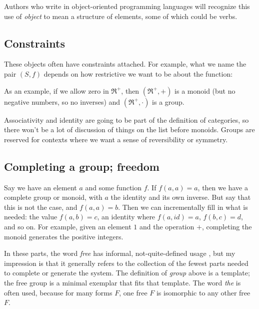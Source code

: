 \documentclass[11pt]{article}
\begin{document}
Authors who write in object-oriented programming languages will recognize this
use of {\em object} to mean a structure of elements, some of which could be verbs.

\subsection{Constraints}
These objects often have constraints attached. For example, what we name the pair $(S, f)$ depends on
how restrictive we want to be about the function:


As an example, if we allow zero in $\Re^+$, then $(\Re^+, +)$ is a monoid (but no
negative numbers, so no inverses) and $(\Re^+, \cdot)$ is a group.

Associativity and identity are going to be part of the definition of categories,
so there won't be a lot of discussion of things on the list before monoids.
Groups are reserved for contexts where we want a sense of reversibility or symmetry.

\subsection{Completing a group; freedom} Say we have an element $a$ and some function $f$. If
$f(a,a)=a$, then we have a complete group or monoid, with $a$ the identity and its own
inverse.  But say that this is not the case, and $f(a,a)=b$. Then we can incrementally fill in what is
needed: the value $f(a,b)=c$, an identity where $f(a, id)=a$, $f(b,c)=d$, and so on. 
For example, given an element $1$ and the operation $+$, completing the monoid generates
the positive integers.

In these parts, the word {\em free} has informal, not-quite-defined usage
\citep{leinster:basic}, but my impression is that it generally refers to the collection
of the fewest parts needed to complete or generate the system.  The definition of
{\em group} above is a template; the free group is a minimal exemplar that fits that
template. The word {\em the} is often used, because for many forms $F$, one free $F$
is isomorphic to any other free $F$.
\end{document}
